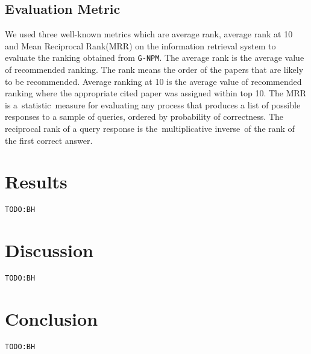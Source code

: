 \documentclass{llncs}
\newcommand{\name}{\texttt{G-NPM}\xspace}
\newcommand{\todo}[1]{\texttt{\color{red}TODO:#1}}
\begin{document}
\subsection{Evaluation Metric}
We used three well-known metrics which are average rank, average rank at 10 and Mean Reciprocal Rank(MRR) on the information retrieval system to evaluate the ranking obtained from \name. The average rank is the average value of recommended ranking. The rank means the order of the papers that are likely to be recommended. Average ranking at 10 is the average value of recommended ranking where the appropriate cited paper was assigned within top 10. The MRR is a statistic measure for evaluating any process that produces a list of possible responses to a sample of queries, ordered by probability of correctness. The reciprocal rank of a query response is the multiplicative inverse of the rank of the first correct answer.


\section{Results}
\todo{BH}

\section{Discussion}
\todo{BH}

\section{Conclusion}
\label{sec:Conclusion}
\todo{BH}




\end{document}
